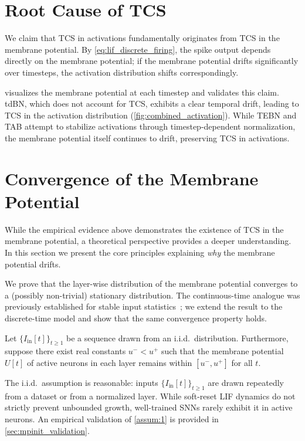 \section{Root Cause of TCS}
\label{sec:mpinit_root}

We claim that TCS in activations fundamentally originates from TCS in the membrane potential. By \cref{eq:lif_discrete_firing}, the spike output depends directly on the membrane potential; if the membrane potential drifts significantly over timesteps, the activation distribution shifts correspondingly.

 visualizes the membrane potential at each timestep and validates this claim. tdBN, which does not account for TCS, exhibits a clear temporal drift, leading to TCS in the activation distribution (\cref{fig:combined_activation}). While TEBN and TAB attempt to stabilize activations through timestep-dependent normalization, the membrane potential itself continues to drift, preserving TCS in activations.

\section{Convergence of the Membrane Potential}
\label{sec:mpinit_theorem}

While the empirical evidence above demonstrates the existence of TCS in the membrane potential, a theoretical perspective provides a deeper understanding. In this section we present the core principles explaining \emph{why} the membrane potential drifts.

We prove that the layer-wise distribution of the membrane potential converges to a (possibly non-trivial) stationary distribution. The continuous-time analogue was previously established for stable input statistics~\cite{dumont:2017}; we extend the result to the discrete-time model and show that the same convergence property holds.

\begin{assumption}
\label{assum:1}
Let $\{I_{\text{in}}[t]\}_{t\ge1}$ be a sequence drawn from an i.i.d.\ distribution. Furthermore, suppose there exist real constants $u^- < u^+$ such that the membrane potential $U[t]$ of active neurons in each layer remains within $[u^-, u^+]$ for all $t$.
\end{assumption}

The i.i.d.\ assumption is reasonable: inputs $\{I_{\text{in}}[t]\}_{t\ge1}$ are drawn repeatedly from a dataset or from a normalized layer. While soft-reset LIF dynamics do not strictly prevent unbounded growth, well-trained SNNs rarely exhibit it in active neurons. An empirical validation of \cref{assum:1} is provided in \cref{sec:mpinit_validation}.

